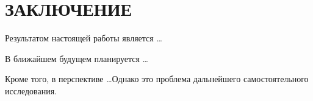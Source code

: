 \section*{\MakeTextUppercase{Заключение}}

Результатом настоящей работы является \ldots

В ближайшем будущем планируется \ldots

Кроме того, в перспективе \ldots Однако это проблема дальнейшего самостоятельного исследования.